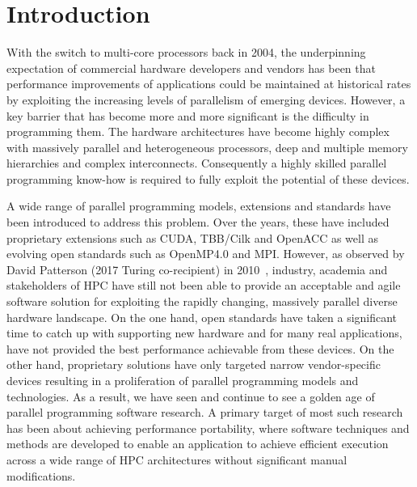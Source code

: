 \documentclass[runningheads]{llncs}
\begin{document}
\vspace{-30pt}
\section{Introduction}

\noindent With the switch to multi-core processors back in 2004, the 
underpinning expectation of commercial hardware developers and vendors has been 
that performance improvements of applications could be maintained at historical 
rates by exploiting the increasing levels of parallelism of emerging devices. 
However, a key barrier that has become more and more significant is the 
difficulty in programming them. The hardware architectures have become 
highly complex with massively parallel and heterogeneous processors, deep and 
multiple memory hierarchies and complex interconnects. Consequently a 
highly skilled parallel programming know-how is required to fully exploit the 
potential of these devices. 

A wide range of parallel programming models, extensions and standards have been 
introduced to address this problem. Over the years, these have included 
proprietary extensions such as CUDA, TBB/Cilk and OpenACC as well as evolving 
open standards such as OpenMP4.0 and MPI. 
However, as observed by 
David Patterson (2017 Turing co-recipient) in 2010~\cite{Patterson2010}, 
industry, academia and stakeholders of HPC have still not been able to provide 
an acceptable and agile software solution for exploiting the rapidly changing, 
massively parallel diverse hardware landscape. On the one hand, open standards 
have taken a significant time to catch up with supporting new hardware and for 
many real applications, have not provided the best performance achievable from 
these devices. On the other hand, proprietary solutions have only targeted 
narrow vendor-specific devices resulting in a proliferation of parallel 
programming models and technologies. As a result, we have seen and continue to 
see a golden age of parallel programming software research. A primary target of 
most such research has been about achieving performance portability, where 
software techniques and methods are developed to 
enable an application to achieve efficient execution across 
a wide range of HPC architectures without significant 
manual modifications.

\end{document}

